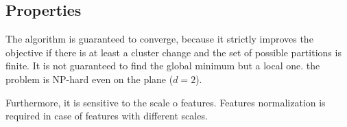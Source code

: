 \subsection{Properties}
The algorithm is guaranteed to converge, because it strictly improves the objective if there is at least a cluster change and the set of possible partitions is finite. It is not guaranteed to find the global minimum but a local one. the problem is NP-hard even on the plane (\(d=2\)). 

Furthermore, it is sensitive to the scale o features. Features normalization is required in case of features with different scales.